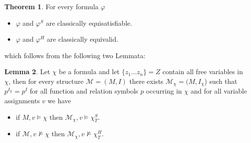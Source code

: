 \documentclass[a4paper,11pt]{report}
\theoremstyle{definition}
\newtheorem{theorem}{Theorem}[section]
\theoremstyle{definition}
\theoremstyle{definition}
\newtheorem{lemma}[theorem]{Lemma}
\theoremstyle{definition}
\theoremstyle{definition}
\theoremstyle{definition}
\theoremstyle{definition}
\begin{document}
	\begin{theorem}
		\label{thm:herbrand-skolem}
		For every formula $\varphi$
		\begin{itemize}
			\item $\varphi$ and $\varphi^S$ are classically equisatisfiable.
			\item $\varphi$ and $\varphi^H$ are classically equivalid.
		\end{itemize}
	\end{theorem}
	which follows from the following two Lemmata:
	\begin{lemma}
		Let $\chi$ be a formula and let $\{z_1\dots z_n\} = Z$ contain all free variables in $\chi$, then for every structure $\mathcal M = (M, I)$ there exists $\mathcal M_\chi = (M, I_\chi$) such that $p^{I_{\chi}} = p^I$ for all function and relation symbols $p$ occurring in $\chi$ and for all variable assignments $v$ we have
		\begin{itemize}
			\item if $M, v \models\chi$ then $\mathcal M_\chi, v\models\chi^S_T$.
			\item if $\mathcal M, v\not\models\chi$ then $\mathcal M_\chi, v\not\models\chi^H_T$.
		\end{itemize}
	\end{lemma}
	
\end{document}
